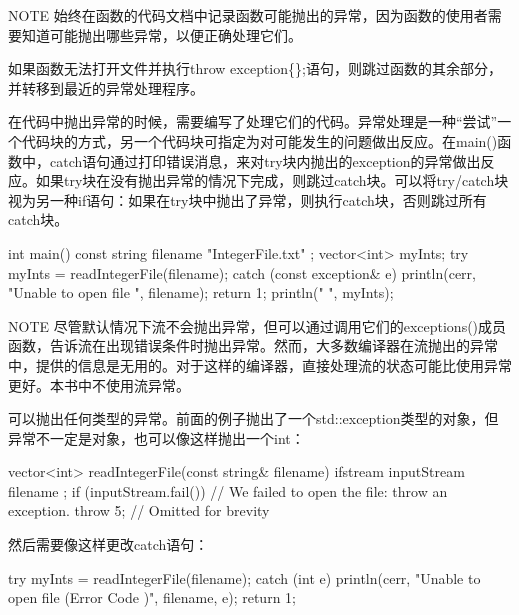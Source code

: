 \begin{myNotic}{NOTE}
始终在函数的代码文档中记录函数可能抛出的异常，因为函数的使用者需要知道可能抛出哪些异常，以便正确处理它们。
\end{myNotic}

如果函数无法打开文件并执行throw exception\{\};语句，则跳过函数的其余部分，并转移到最近的异常处理程序。

在代码中抛出异常的时候，需要编写了处理它们的代码。异常处理是一种“尝试”一个代码块的方式，另一个代码块可指定为对可能发生的问题做出反应。在main()函数中，catch语句通过打印错误消息，来对try块内抛出的exception的异常做出反应。如果try块在没有抛出异常的情况下完成，则跳过catch块。可以将try/catch块视为另一种if语句：如果在try块中抛出了异常，则执行catch块，否则跳过所有catch块。

\begin{cpp}
int main()
{
    const string filename { "IntegerFile.txt" };
    vector<int> myInts;
    try {
        myInts = readIntegerFile(filename);
    } catch (const exception& e) {
        println(cerr, "Unable to open file {}", filename);
        return 1;
    }
    println("{} ", myInts);
}
\end{cpp}

\begin{myNotic}{NOTE}
尽管默认情况下流不会抛出异常，但可以通过调用它们的exceptions()成员函数，告诉流在出现错误条件时抛出异常。然而，大多数编译器在流抛出的异常中，提供的信息是无用的。对于这样的编译器，直接处理流的状态可能比使用异常更好。本书中不使用流异常。
\end{myNotic}


可以抛出任何类型的异常。前面的例子抛出了一个std::exception类型的对象，但异常不一定是对象，也可以像这样抛出一个int：

\begin{cpp}
vector<int> readIntegerFile(const string& filename)
{
    ifstream inputStream { filename };
    if (inputStream.fail()) {
        // We failed to open the file: throw an exception.
        throw 5;
    }
    // Omitted for brevity
}
\end{cpp}

然后需要像这样更改catch语句：

\begin{cpp}
try {
    myInts = readIntegerFile(filename);
} catch (int e) {
    println(cerr, "Unable to open file {} (Error Code {})", filename, e);
    return 1;
}
\end{cpp}


